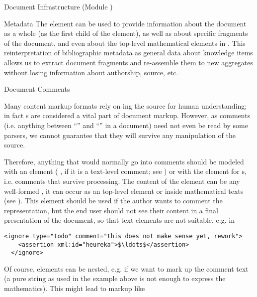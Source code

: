 \begin{tchapter}[id=omdoc-infrastructure,short=Document Infrastructure]{Document Infrastructure (Module )}
{\begin{tsection}[id=metadata]{Metadata}
  The  element can be used to provide information about the
  document as a whole (as the first child of the  element), as well as
  about specific fragments of the document, and even about the top-level mathematical
  elements in \omdoc. This reinterpretation of bibliographic metadata as general data
  about knowledge items allows us to extract document fragments and re-assemble them to
  new aggregates without losing information about authorship, source, etc.
\end{tsection}

\begin{tsection}[id=comments]{Document Comments}
  
  Many content markup formats rely on {ing} the source for human
  understanding; in fact {s} are considered a vital part of
  document markup. However, as {\xml} comments (i.e. anything between
  ``'' and ``\snippetin{-->}'' in a document) need not even be
  read by some {\xml} parsers, we cannot guarantee that they will
  survive any {\xml} manipulation of the \omdoc source.

  Therefore, anything that would normally go into comments should be modeled with an
   element ( ,
  if it is a text-level comment; see ) or with the 
  element for {s}, i.e.  comments that survive processing.
  The content of the  element can be any well-formed \omdoc, it can
  occur as an \omdoc top-level element or inside mathematical texts (see
  ). This element should be used if the author wants to comment the
  \omdoc representation, but the end user should not see their content in a final
  presentation of the document, so that \omdoc text elements are not suitable, e.g. in

\begin{lstlisting}[numbers=none,index={ignore},mathescape]
  <ignore type="todo" comment="this does not make sense yet, rework">
    <assertion xml:id="heureka">$\ldots$</assertion>
  </ignore>
\end{lstlisting}

Of course,  elements can be nested, e.g. if we want to mark up
the comment text (a pure string as used in the example above is not enough to
express the mathematics). This might lead to markup like 


\end{tsection}}
\end{tchapter}
